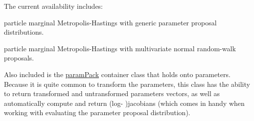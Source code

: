 The current availability includes\+:


\begin{DoxyEnumerate}
\item particle marginal Metropolis-\/\+Hastings with generic parameter proposal distributions.
\item particle marginal Metropolis-\/\+Hastings with multivariate normal random-\/walk proposals.
\end{DoxyEnumerate}

Also included is the {\ttfamily \hyperlink{classparamPack}{param\+Pack}} container class that holds onto parameters. Because it is quite common to transform the parameters, this class has the ability to return transformed and untransformed parameters vectors, as well as automatically compute and return (log-\/ )jacobians (which comes in handy when working with evaluating the parameter proposal distribution). 